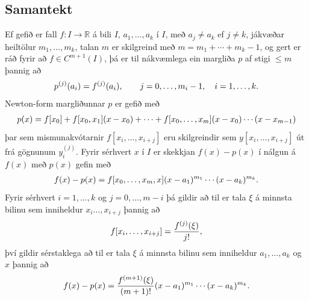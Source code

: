 \documentclass[A4paper,10pt,icelandic]{sphinxmanual}
\begin{document}
\subsection{Samantekt}
\label{kafli03:id9}
Ef gefið er fall \(f:I\to {{\mathbb  R}}\) á bili \(I\),
\(a_1,\dots,a_k\) í \(I\), með \(a_j\neq a_k\) ef
\(j\neq k\), jákvæðar heiltölur \(m_1,\dots,m_k\), talan
\(m\) er skilgreind með \(m=m_1+\cdots+m_k-1\), og gert er ráð
fyrir að \(f\in C^{m+1}(I)\), þá er til nákvæmlega ein margliða
\(p\) af stigi \(\leq m\) þannig að
\begin{gather}
\begin{split}p^{(j)}(a_i)=f^{(j)}(a_i), \qquad j=0,\dots, m_i-1, \quad i=1,\dots,k.\end{split}\notag
\end{gather}
Newton-form margliðunnar \(p\) er gefið með
\begin{gather}
\begin{split}p(x)=f[x_0]+f[x_0,x_1](x-x_0)+\cdots+f[x_0,\dots,x_m](x-x_0)\cdots(x-x_{m-1})\end{split}\notag
\end{gather}
þar sem mismunakvótarnir \(f[x_i,\dots,x_{i+j}]\) eru skilgreindir
sem \(y[x_i,\dots,x_{i+j}]\) út frá gögnunum \(y^{(j)}_i\).
Fyrir sérhvert \(x\) í \(I\) er skekkjan \(f(x)-p(x)\) í
nálgun á \(f(x)\) með \(p(x)\) gefin með
\begin{gather}
\begin{split}f(x)-p(x)=f[x_0,\dots,x_m,x](x-a_1)^{m_1}\cdots(x-a_k)^{m_k}.\end{split}\notag
\end{gather}
Fyrir sérhvert \(i=1,\dots,k\) og \(j=0,\dots,m-i\) þá gildir að
til er tala \(\xi\) á minnsta bilinu sem inniheldur
\(x_i\dots,x_{i+j}\) þannig að
\begin{gather}
\begin{split}f[x_i,\dots,x_{i+j}]=\dfrac{f^{(j)}(\xi)}{j!},\end{split}\notag
\end{gather}
því gildir sérstaklega að til er tala \(\xi\) á minnsta bilinu sem
inniheldur \(a_1,\dots,a_k\) og \(x\) þannig að
\begin{gather}
\begin{split}f(x)-p(x)=\dfrac{f^{(m+1)}(\xi)}{(m+1)!}(x-a_1)^{m_1}\cdots(x-a_k)^{m_k}.\end{split}\notag
\end{gather}
\end{document}
